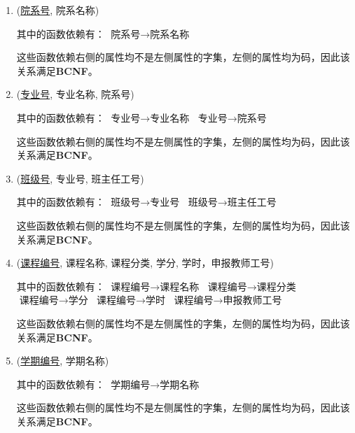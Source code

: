 \begin{enumerate}
    \item (\uline{院系号}, 院系名称) \par
    其中的函数依赖有： \newline
    $\text{院系号} \rightarrow \text{院系名称}$ \par
    这些函数依赖右侧的属性均不是左侧属性的字集，左侧的属性均为码，因此该关系满足\textbf{BCNF}。
    
    \item (\uline{专业号}, 专业名称, 院系号) \par
    其中的函数依赖有： \newline
    $\text{专业号} \rightarrow \text{专业名称}$ \newline
    $\text{专业号} \rightarrow \text{院系号}$ \par
    这些函数依赖右侧的属性均不是左侧属性的字集，左侧的属性均为码，因此该关系满足\textbf{BCNF}。
    
    \item (\uline{班级号}, 专业号, 班主任工号) \par
    其中的函数依赖有： \newline
    $\text{班级号} \rightarrow \text{专业号}$ \newline
    $\text{班级号} \rightarrow \text{班主任工号}$ \par
    这些函数依赖右侧的属性均不是左侧属性的字集，左侧的属性均为码，因此该关系满足\textbf{BCNF}。
    
    \item (\uline{课程编号}, 课程名称, 课程分类, 学分, 学时，申报教师工号) \par
    其中的函数依赖有： \newline
    $\text{课程编号} \rightarrow \text{课程名称}$ \newline
    $\text{课程编号} \rightarrow \text{课程分类}$ \newline
    $\text{课程编号} \rightarrow \text{学分}$ \newline
    $\text{课程编号} \rightarrow \text{学时}$ \newline
    $\text{课程编号} \rightarrow \text{申报教师工号}$ \par
    这些函数依赖右侧的属性均不是左侧属性的字集，左侧的属性均为码，因此该关系满足\textbf{BCNF}。
    
    \item (\uline{学期编号}, 学期名称) \par
    其中的函数依赖有： \newline
    $\text{学期编号} \rightarrow \text{学期名称}$ \par
    这些函数依赖右侧的属性均不是左侧属性的字集，左侧的属性均为码，因此该关系满足\textbf{BCNF}。
    

\end{enumerate}

